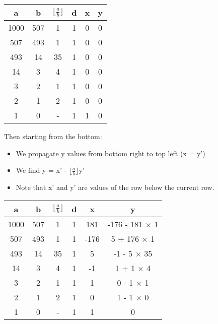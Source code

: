 \documentclass[11pt]{article}
\begin{document}
\begin{enumerate}
\begin{itemize}
            \begin{center}
            \begin{tabular}{| c | c | c | c | c | c |} 
            \hline
            a & b & ${\lfloor}\frac{a}{b}{\rfloor}$ & d & x & y \\
            \hline
            1000 & 507 & 1 & 1 & 0 & 0 \\
            507 & 493 & 1 & 1 & 0 & 0 \\
            493 & 14 & 35 & 1 & 0 & 0 \\
            14 & 3 & 4 & 1 & 0 & 0 \\
            3 & 2 & 1 & 1 & 0 & 0 \\
            2 & 1 & 2 & 1 & 0 & 0 \\
            1 & 0 & - & 1 & 1 & 0 \\
            \hline
            \end{tabular}
            \end{center}
            Then starting from the bottom: \\
            \begin{itemize}
                \item We propagate y values from bottom right to top left (x = y')
                \item We find y = x' - ${\lfloor}\frac{a}{b}{\rfloor}$y'
                \item Note that x' and y' are values of the row below the current row.
            \end{itemize}
            \begin{center}
            \begin{tabular}{| c | c | c | c | c | c |} 
            \hline
            a & b & ${\lfloor}\frac{a}{b}{\rfloor}$ & d & x & y \\
            \hline
            1000 & 507 & 1 & 1 & 181 & -176 - 181 $\times$ 1 \\
            507 & 493 & 1 & 1 & -176 & 5 + 176 $\times$ 1 \\
            493 & 14 & 35 & 1 & 5 & -1 - 5 $\times$ 35 \\
            14 & 3 & 4 & 1 & -1 & 1 + 1 $\times$ 4 \\
            3 & 2 & 1 & 1 & 1 & 0 - 1 $\times$ 1 \\
            2 & 1 & 2 & 1 & 0 & 1 - 1 $\times$ 0 \\
            1 & 0 & - & 1 & 1 & 0 \\
            \hline
            \end{tabular}

\end{center}
\end{itemize}
\end{enumerate}
\end{document}
